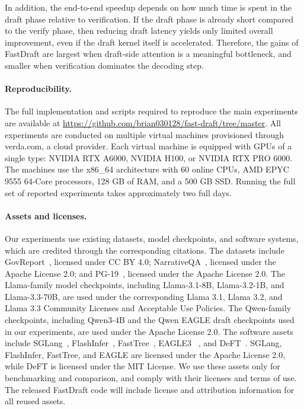 \documentclass{article}
\begin{document}
In addition, the end-to-end speedup depends on how much time is spent in the draft phase relative to verification. If the draft phase is already short compared to the verify phase, then reducing draft latency yields only limited overall improvement, even if the draft kernel itself is accelerated. Therefore, the gains of FastDraft are largest when draft-side attention is a meaningful bottleneck, and smaller when verification dominates the decoding step.

\paragraph{Reproducibility.} The full implementation and scripts required to reproduce the main experiments are available at \url{https://github.com/brian030128/fast-draft/tree/master}.
All experiments are conducted on multiple virtual machines provisioned through verda.com, a cloud provider. Each virtual machine is equipped with GPUs of a single type: NVIDIA RTX A6000, NVIDIA H100, or NVIDIA RTX PRO 6000. The machines use the x86\_64 architecture with 60 online CPUs, AMD EPYC 9555 64-Core processors, 128 GB of RAM, and a 500 GB SSD. Running the full set of reported experiments takes approximately two full days.

\paragraph{Assets and licenses.}
Our experiments use existing datasets, model checkpoints, and software systems, which are credited through the corresponding citations. The datasets include GovReport~\cite{huang-etal-2021-efficient}, licensed under CC BY 4.0; NarrativeQA~\citep{kočiský2017narrativeqareadingcomprehensionchallenge}, licensed under the Apache License 2.0; and PG-19~\cite{raecompressive2019}, licensed under the Apache License 2.0. The Llama-family model checkpoints, including Llama-3.1-8B, Llama-3.2-1B, and Llama-3.3-70B, are used under the corresponding Llama 3.1, Llama 3.2, and Llama 3.3 Community Licenses and Acceptable Use Policies. The Qwen-family checkpoints, including Qwen3-4B and the Qwen EAGLE draft checkpoints used in our experiments, are used under the Apache License 2.0. The software assets include SGLang~\cite{10.5555/3737916.3739916}, FlashInfer~\cite{ye2025flashinferefficientcustomizableattention}, FastTree~\citep{pan2025fasttree}, EAGLE3 ~\cite{li2025eagle3scalinginferenceacceleration}, and DeFT~\cite{yao2025deftdecodingflashtreeattention}. SGLang, FlashInfer, FastTree, and EAGLE are licensed under the Apache License 2.0, while DeFT is licensed under the MIT License. We use these assets only for benchmarking and comparison, and comply with their licenses and terms of use. The released FastDraft code will include license and attribution information for all reused assets.

\newpage

\end{document}

